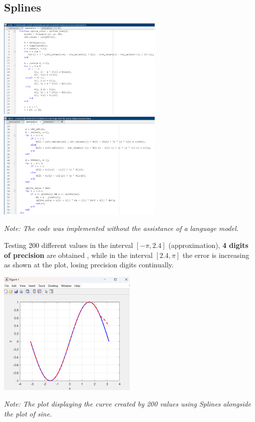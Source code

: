 \documentclass{article}
\begin{document}
\subsection{Splines}
\begin{tcolorbox}[colback=red!10, colframe=gray!80, width=\textwidth, sharp corners]
    \centering 
    \includegraphics[width=0.6\textwidth,height=0.21\textheight]{Exercise5bCode.png} 
    \includegraphics[width=0.6\textwidth,height=0.21\textheight]{Exercise5bCode2.png} 


    
    \vspace{0.5cm}
    \small\textit{Note: The code was implemented without the assistance of a language model. }
\end{tcolorbox}
 Testing 200 different values in the interval $ [-\pi,2.4]$ (approximation),\textbf{ 4 digits of precision} are obtained , while in the interval $ [2.4,\pi]$ the error is increasing as shown at the plot, losing precision digits continually.
  

\begin{tcolorbox}[colback=red!10, colframe=gray!80, width=\textwidth, sharp corners]
    \centering 
    \includegraphics[width=0.5\textwidth,height=0.21\textheight]{Exercise5bPlot.png} 

    \vspace{0.5cm}
    \small\textit{Note: The plot displaying the curve created by 200 values using  Splines alongside the plot of sine. }
\end{tcolorbox}  
\end{document}
